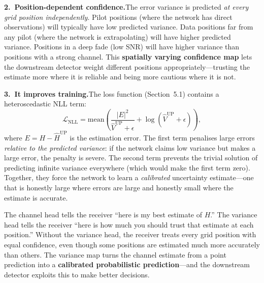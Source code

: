 \documentclass[11pt,a4paper]{article}
\begin{document}
	\textbf{2.\ Position-dependent confidence.}\quad The error variance is predicted \emph{at every grid position independently}.  Pilot positions (where the network has direct observations) will typically have low predicted variance.  Data positions far from any pilot (where the network is extrapolating) will have higher predicted variance.  Positions in a deep fade (low SNR) will have higher variance than positions with a strong channel.  This \textbf{spatially varying confidence map} lets the downstream detector weight different positions appropriately---trusting the estimate more where it is reliable and being more cautious where it is not.
	
	\textbf{3.\ It improves training.}\quad The loss function (Section~5.1) contains a heteroscedastic NLL term:
	\[
	\mathcal{L}_{\mathrm{NLL}} = \mathrm{mean}\!\left(\frac{|E|^2}{\widehat{V}^{\mathrm{UP}} + \epsilon} + \log(\widehat{V}^{\mathrm{UP}} + \epsilon)\right),
	\]
	where $E = H - \widehat{H}^{\mathrm{UP}}$ is the estimation error.  The first term penalises large errors \emph{relative to the predicted variance}: if the network claims low variance but makes a large error, the penalty is severe.  The second term prevents the trivial solution of predicting infinite variance everywhere (which would make the first term zero).  Together, they force the network to learn a \emph{calibrated} uncertainty estimate---one that is honestly large where errors are large and honestly small where the estimate is accurate.
	
	\begin{keyidea}
		The channel head tells the receiver ``here is my best estimate of $H$.''  The variance head tells the receiver ``here is how much you should trust that estimate at each position.''  Without the variance head, the receiver treats every grid position with equal confidence, even though some positions are estimated much more accurately than others.  The variance map turns the channel estimate from a point prediction into a \textbf{calibrated probabilistic prediction}---and the downstream detector exploits this to make better decisions.
	\end{keyidea}
	
	
\end{document}
